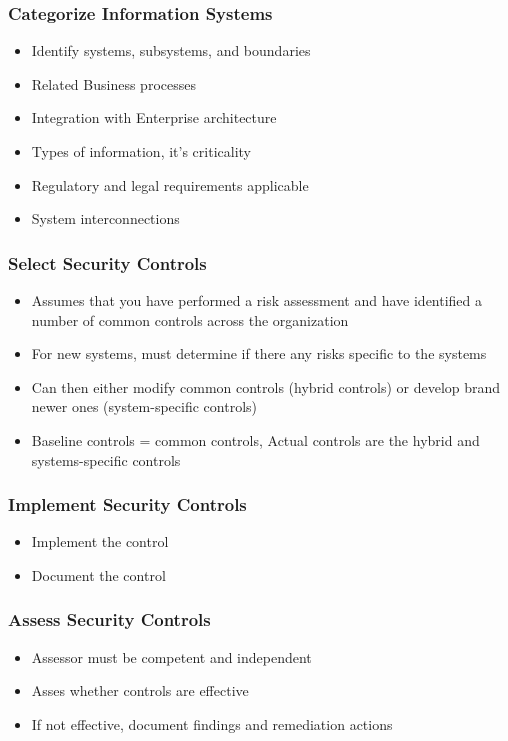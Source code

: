\documentclass[11pt]{article}
\begin{document}
\subsubsection{Categorize Information Systems}
\label{sec:orga0eefb3}
\begin{itemize}
\item Identify systems, subsystems, and boundaries
\item Related Business processes
\item Integration with Enterprise architecture
\item Types of information, it's criticality
\item Regulatory and legal requirements applicable
\item System interconnections
\end{itemize}
\subsubsection{Select Security Controls}
\label{sec:orgb05f886}
\begin{itemize}
\item Assumes that you have performed a risk assessment and have identified a number of common controls across the organization
\item For new systems, must determine if there any risks specific to the systems
\item Can then either modify common controls (hybrid controls) or develop brand newer ones (system-specific controls)
\item Baseline controls = common controls, Actual controls are the hybrid and systems-specific controls
\end{itemize}
\subsubsection{Implement Security Controls}
\label{sec:orgf70dcc7}
\begin{itemize}
\item Implement the control
\item Document the control
\end{itemize}
\subsubsection{Assess Security Controls}
\label{sec:org5779bd9}
\begin{itemize}
\item Assessor must be competent and independent
\item Asses whether controls are effective
\item If not effective, document findings and remediation actions
\end{itemize}
\end{document}
